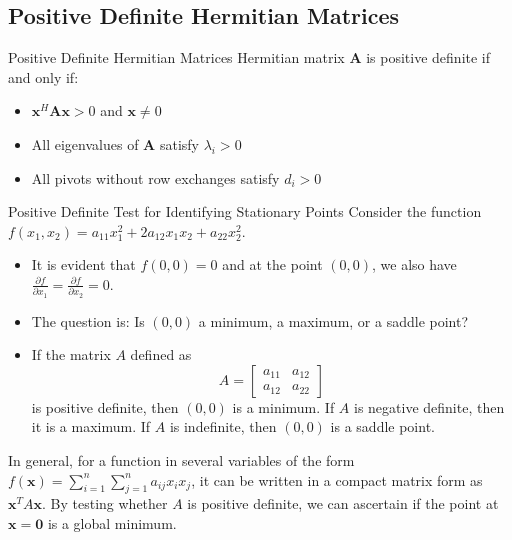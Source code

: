 \subsection{Positive Definite Hermitian Matrices}



\begin{definitionbox}{Positive Definite Hermitian Matrices}
    Hermitian matrix \textbf{A} is positive definite if and only if:

    \begin{itemize}
        \item $\textbf{x}^H\textbf{Ax} > 0$ and $\textbf{x} \neq 0$
        \item All eigenvalues of \textbf{A} satisfy $\lambda_i > 0$
        \item All pivots without row exchanges satisfy $ d_i>0$
    \end{itemize}
\end{definitionbox}

\begin{examplebox}{Positive Definite Test for Identifying Stationary Points}
Consider the function \( f(x_1, x_2) = a_{11}x_1^2 + 2a_{12}x_1x_2 + a_{22}x_2^2 \).

\begin{itemize}
    \item It is evident that \( f(0,0) = 0 \) and at the point \( (0,0) \), we also have \(\frac{\partial f}{\partial x_1} = \frac{\partial f}{\partial x_2} = 0\).
    \item The question is: Is \( (0,0) \) a minimum, a maximum, or a saddle point?
    \item If the matrix \( A \) defined as
    \[
    A =
    \begin{bmatrix}
    a_{11} & a_{12} \\
    a_{12} & a_{22}
    \end{bmatrix}
    \]
    is positive definite, then \( (0,0) \) is a minimum. If \( A \) is negative definite, then it is a maximum. If \( A \) is indefinite, then \( (0,0) \) is a saddle point.
\end{itemize}

In general, for a function in several variables of the form \( f(\mathbf{x}) = \sum_{i=1}^{n} \sum_{j=1}^{n} a_{ij}x_ix_j \), it can be written in a compact matrix form as \( \mathbf{x}^T A \mathbf{x} \). By testing whether \( A \) is positive definite, we can ascertain if the point at \( \mathbf{x} = \mathbf{0} \) is a global minimum.

\end{examplebox}


